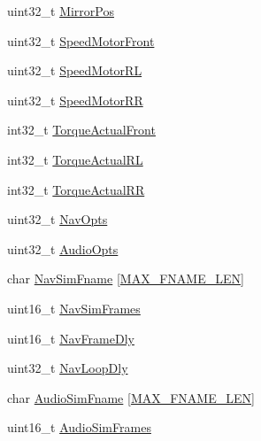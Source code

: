 \begin{DoxyCompactItemize}
\item 
uint32\+\_\+t \mbox{\hyperlink{structDP__ITEM__STORAGE__T_ac498cad2e6d04f4135d872a2358cfbe3}{Mirror\+Pos}}
\item 
uint32\+\_\+t \mbox{\hyperlink{structDP__ITEM__STORAGE__T_a8fda4aa9e6bc9fe5ffe6c1705285e70e}{Speed\+Motor\+Front}}
\item 
uint32\+\_\+t \mbox{\hyperlink{structDP__ITEM__STORAGE__T_a6383511479efcb6ac6d4a7f41c691027}{Speed\+Motor\+RL}}
\item 
uint32\+\_\+t \mbox{\hyperlink{structDP__ITEM__STORAGE__T_ab1c4b6808c94468126bd00269bc9e7fa}{Speed\+Motor\+RR}}
\item 
int32\+\_\+t \mbox{\hyperlink{structDP__ITEM__STORAGE__T_a1c0765ccc41e8230339855e1ec8e7496}{Torque\+Actual\+Front}}
\item 
int32\+\_\+t \mbox{\hyperlink{structDP__ITEM__STORAGE__T_a9fbc33f0efc452e936b3581789aaebaf}{Torque\+Actual\+RL}}
\item 
int32\+\_\+t \mbox{\hyperlink{structDP__ITEM__STORAGE__T_abd94f29af5cecaabd920330d94fbf9e5}{Torque\+Actual\+RR}}
\item 
uint32\+\_\+t \mbox{\hyperlink{structDP__ITEM__STORAGE__T_a317e169acba847a9964dc2919242e5fe}{Nav\+Opts}}
\item 
uint32\+\_\+t \mbox{\hyperlink{structDP__ITEM__STORAGE__T_a669fbdb5b7b1aa29996ca3f3afa14a54}{Audio\+Opts}}
\item 
char \mbox{\hyperlink{structDP__ITEM__STORAGE__T_a536c4b31c7075b16e3af19834891af78}{Nav\+Sim\+Fname}} \mbox{[}\mbox{\hyperlink{gp__cfg_8h_a1f8d496b8c007e6a4f722f137cb08c84}{M\+A\+X\+\_\+\+F\+N\+A\+M\+E\+\_\+\+L\+EN}}\mbox{]}
\item 
uint16\+\_\+t \mbox{\hyperlink{structDP__ITEM__STORAGE__T_aa54c48754e61b24b70f3b59e9f875860}{Nav\+Sim\+Frames}}
\item 
uint16\+\_\+t \mbox{\hyperlink{structDP__ITEM__STORAGE__T_aa6a07cd1a1dadc1254467b66bc47f1c1}{Nav\+Frame\+Dly}}
\item 
uint32\+\_\+t \mbox{\hyperlink{structDP__ITEM__STORAGE__T_a14dbb5ea2681c9e469c32df815e9c359}{Nav\+Loop\+Dly}}
\item 
char \mbox{\hyperlink{structDP__ITEM__STORAGE__T_a4350fbca8dbb35fa7c6a381140346d81}{Audio\+Sim\+Fname}} \mbox{[}\mbox{\hyperlink{gp__cfg_8h_a1f8d496b8c007e6a4f722f137cb08c84}{M\+A\+X\+\_\+\+F\+N\+A\+M\+E\+\_\+\+L\+EN}}\mbox{]}
\item 
uint16\+\_\+t \mbox{\hyperlink{structDP__ITEM__STORAGE__T_a90cefa7c896c91189a03143ef643672a}{Audio\+Sim\+Frames}}

\end{DoxyCompactItemize}
